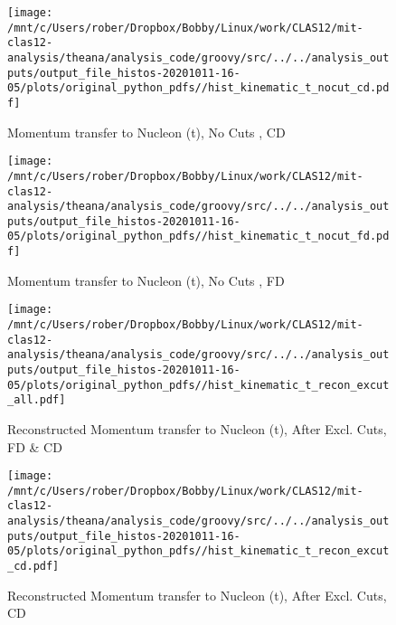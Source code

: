 \documentclass{article}
\begin{document}
\begin{landscape}
    \begin{figure}[h]
        \centering

        \texttt{[image: /mnt/c/Users/rober/Dropbox/Bobby/Linux/work/CLAS12/mit-clas12-analysis/theana/analysis\_code/groovy/src/../../analysis\_outputs/output\_file\_histos-20201011-16-05/plots/original\_python\_pdfs//hist\_kinematic\_t\_nocut\_cd.pdf]}
        \captionsetup{textformat=empty,labelformat=blank}
        \caption{Momentum transfer to Nucleon (t), No Cuts , CD}
    \end{figure}
    \clearpage
    
    \begin{figure}[h]
        \centering

        \texttt{[image: /mnt/c/Users/rober/Dropbox/Bobby/Linux/work/CLAS12/mit-clas12-analysis/theana/analysis\_code/groovy/src/../../analysis\_outputs/output\_file\_histos-20201011-16-05/plots/original\_python\_pdfs//hist\_kinematic\_t\_nocut\_fd.pdf]}
        \captionsetup{textformat=empty,labelformat=blank}
        \caption{Momentum transfer to Nucleon (t), No Cuts , FD}
    \end{figure}
    \clearpage
    
    \begin{figure}[h]
        \centering

        \texttt{[image: /mnt/c/Users/rober/Dropbox/Bobby/Linux/work/CLAS12/mit-clas12-analysis/theana/analysis\_code/groovy/src/../../analysis\_outputs/output\_file\_histos-20201011-16-05/plots/original\_python\_pdfs//hist\_kinematic\_t\_recon\_excut\_all.pdf]}
        \captionsetup{textformat=empty,labelformat=blank}
        \caption{Reconstructed Momentum transfer to Nucleon (t), After Excl. Cuts, FD \& CD}
    \end{figure}
    \clearpage
    
    \begin{figure}[h]
        \centering

        \texttt{[image: /mnt/c/Users/rober/Dropbox/Bobby/Linux/work/CLAS12/mit-clas12-analysis/theana/analysis\_code/groovy/src/../../analysis\_outputs/output\_file\_histos-20201011-16-05/plots/original\_python\_pdfs//hist\_kinematic\_t\_recon\_excut\_cd.pdf]}
        \captionsetup{textformat=empty,labelformat=blank}
        \caption{Reconstructed Momentum transfer to Nucleon (t), After Excl. Cuts, CD}
    \end{figure}
    \clearpage
    
    \begin{figure}[h]
        \centering


\end{figure}
\end{landscape}
\end{document}
